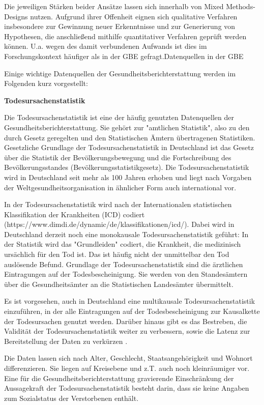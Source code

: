 \documentclass{article}
\begin{document}
Die jeweiligen Stärken beider Ansätze lassen sich innerhalb von Mixed Methods-Designs nutzen. Aufgrund ihrer Offenheit eignen sich qualitative Verfahren insbesondere zur Gewinnung neuer Erkenntnisse und zur Generierung von Hypothesen, die anschließend mithilfe quantitativer Verfahren geprüft werden können. U.a. wegen des damit verbundenen Aufwands ist dies im Forschungskontext häufiger als in der GBE gefragt.Datenquellen in der GBE


Einige wichtige Datenquellen der Gesundheitsberichterstattung werden im Folgenden kurz vorgestellt:


\textbf{Todesursachenstatistik}


Die Todesursachenstatistik ist eine der häufig genutzten Datenquellen der Gesundheitsberichterstattung. Sie gehört zur "amtlichen Statistik", also zu den durch Gesetz geregelten und den Statistischen Ämtern übertragenen Statistiken. Gesetzliche Grundlage der Todesursachenstatistik in Deutschland ist das Gesetz über die Statistik der Bevölkerungsbewegung und die Fortschreibung des Bevölkerungsstandes (Bevölkerungsstatistikgesetz). Die Todesursachenstatistik wird in Deutschland seit mehr als 100 Jahren erhoben und liegt nach Vorgaben der Weltgesundheitsorganisation in ähnlicher Form auch international vor. 


In der Todesursachenstatistik wird nach der Internationalen statistischen Klassifikation der Krankheiten (ICD) codiert (https://www.dimdi.de/dynamic/de/klassifikationen/icd/). Dabei wird in Deutschland derzeit noch eine monokausale Todesursachenstatistik geführt: In der Statistik wird das "Grundleiden" codiert, die Krankheit, die medizinisch ursächlich für den Tod ist. Das ist häufig nicht der unmittelbar den Tod auslösende Befund. Grundlage der Todesursachenstatistik sind die ärztlichen Eintragungen auf der Todesbescheinigung. Sie werden von den Standesämtern über die Gesundheitsämter an die Statistischen Landesämter übermittelt.


Es ist vorgesehen, auch in Deutschland eine multikausale Todesursachenstatistik einzuführen, in der alle Eintragungen auf der Todesbescheinigung zur Kausalkette der Todesursachen genutzt werden. Darüber hinaus gibt es das Bestreben, die Validität der Todesursachenstatistik weiter zu verbessern, sowie die Latenz zur Bereitstellung der Daten zu verkürzen \autocite{EckertOlafundweitere2018}.                     


Die Daten lassen sich nach Alter, Geschlecht, Staatsangehörigkeit und Wohnort differenzieren. Sie liegen auf Kreisebene und z.T. auch noch kleinräumiger vor. Eine für die Gesundheitsberichterstattung gravierende Einschränkung der Aussagekraft der Todesursachenstatistik besteht darin, dass sie keine Angaben zum Sozialstatus der Verstorbenen enthält. 
\end{document}

